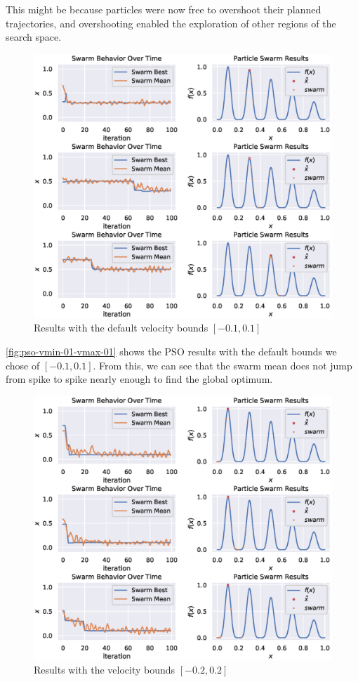 \documentclass[12pt]{article}
\begin{document}
This might be because particles were now free to overshoot their planned trajectories, and overshooting enabled the exploration of other regions of the search space.

\begin{figure}[H]
    \centering
    \includegraphics[width=\textwidth]{figures/pso/pso-v01.eps}
    \caption{Results with the default velocity bounds $[-0.1, 0.1]$}\label{fig:pso-vmin-01-vmax-01}
\end{figure}

\autoref{fig:pso-vmin-01-vmax-01} shows the PSO results with the default bounds we chose of $[-0.1, 0.1]$.
From this, we can see that the swarm mean does not jump from spike to spike nearly enough to find the global optimum.

\begin{figure}[H]
    \centering
    \includegraphics[width=\textwidth]{figures/pso/pso-v021.eps}
    \caption{Results with the velocity bounds $[-0.2, 0.2]$}\label{fig:pso-vmin-02-vmax-02}
\end{figure}
\end{document}
